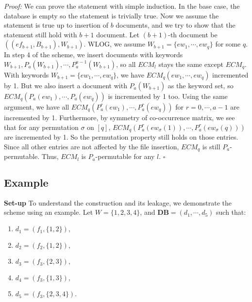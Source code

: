 \documentclass{article}
\newcommand{\db}{\textbf{DB}}
\newcommand{\doc}{d}
\newcommand{\file}{f}
\newcommand{\efile}{ef}
\newcommand{\kwset}{W}
\newcommand{\ekw}{ew}
\newcommand{\ecmatrix}{ECM}
\begin{document}
\textit{Proof:} We can prove the statement with simple induction. In the base case, the database is empty so the statement is trivially true. Now we assume the statement is true up to insertion of $b$ documents, and we try to show that the statement still hold with $b+1$ document. Let $(b+1)$-th document be $((\efile_{b+1}, B_{b+1}), \kwset_{b+1})$. WLOG, we assume $\kwset_{b+1} = \{\ekw_1, \cdots, \ekw_q \}$ for some $q$. In step 4 of the scheme, we insert documents with keywords $\kwset_{b+1}, P_a(\kwset_{b+1}), \cdots, P_a^{a-1}(\kwset_{b+1})$, so all $\ecmatrix_l$ stays the same except $\ecmatrix_q$. With keywords $\kwset_{b+1} = \{\ekw_1, \cdots, \ekw_q\}$, we have $\ecmatrix_q(\ekw_1, \cdots, \ekw_q)$ incremented by 1. But we also insert a document with $P_a(\kwset_{b+1})$ as the keyword set, so $\ecmatrix_q(P_a(\ekw_1), \cdots, P_a(\ekw_q))$ is incremented by 1 too. Using the same argument, we have all $\ecmatrix_q(P_a^{r}(\ekw_1), \cdots, P_a^{r}(\ekw_q))$ for $r = 0, \cdots, a-1$ are incremented by 1. Furthermore, by symmetry of co-occurrence matrix, we see that for any permutation $\sigma$ on $[q]$, $\ecmatrix_q(P_a^{r}(\ekw_\sigma(1)), \cdots, P_a^{r}(\ekw_\sigma(q)))$ are incremented by 1. So the permutation property still holds on those entries. Since all other entries are not affected by the file insertion, $\ecmatrix_q$ is still $P_a$-permutable. Thus, $\ecmatrix_l$ is $P_a$-permutable for any $l$. $\square$




\subsection{Example}
\textbf{Set-up} To understand the construction and its leakage, we demonstrate the scheme using an example. Let $\kwset = \{1,2,3,4\}$, and $\db = (\doc_1, \cdots, \doc_5)$ such that:
\begin{enumerate}
	\item $\doc_1 = (\file_1, \{1,2\})$,
	\item $\doc_2 = (\file_2, \{1,2\})$,
	\item $\doc_3 = (\file_3, \{2,3\})$,
	\item $\doc_4 = (\file_3, \{1,3\})$,
	\item $\doc_5 = (\file_3, \{2,3,4\})$.
\end{enumerate}
\end{document}
